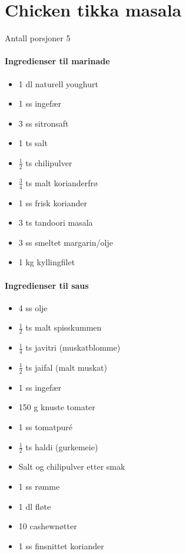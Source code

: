 \section{﻿Chicken tikka masala}
Antall porsjoner 5

\paragraph{Ingredienser til marinade}
\begin{itemize}[noitemsep]
	\item 1 dl naturell youghurt
	\item 1 ss ingefær
	\item 3 ss sitronsaft
	\item 1 ts salt
	\item $\frac{1}{2}$ ts chilipulver
	\item $\frac{3}{4}$ ts malt korianderfrø
	\item 1 ss frisk koriander
	\item 3 ts tandoori masala
	\item 3 ss smeltet margarin/olje
	\item 1 kg kyllingfilet
\end{itemize}

\paragraph{Ingredienser til saus}
\begin{itemize}[noitemsep]
	\item 4 ss olje
	\item  $\frac{1}{2}$ ts malt spisskummen
	\item $\frac{1}{4}$ ts javitri (muskatblomme)
	\item  $\frac{1}{2}$ ts jaifal (malt muskat)
	\item 1 ss ingefær
	\item 150 g knuste tomater
	\item 1 ss tomatpuré
	\item  $\frac{1}{2}$ ts haldi (gurkemeie)
	\item Salt og chilipulver etter smak
	\item 1 ss rømme
	\item 1 dl fløte
	\item 10 cashewnøtter
	\item 1 ss finsnittet koriander
\end{itemize}

